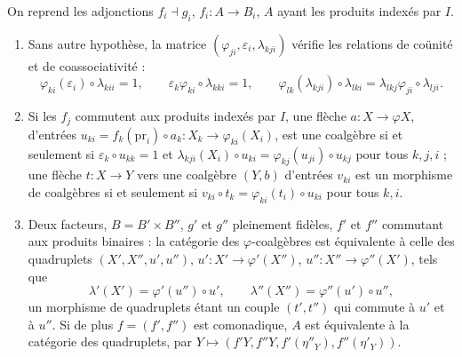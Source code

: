 \begin{encadre}
\begin{theoreme}\label{thm:19-quadruplets}
On reprend les adjonctions $f_i \dashv g_i$, $f_i : A \to B_i$, $A$ ayant les produits indexés par $I$.
\begin{enumerate}
\item Sans autre hypothèse, la matrice $(\varphi_{ji}, \varepsilon_i, \lambda_{kji})$ vérifie les relations de coünité et de coassociativité :
\[
\varphi_{ki}(\varepsilon_i) \circ \lambda_{kii} = 1, \qquad \varepsilon_k \varphi_{ki} \circ \lambda_{kki} = 1, \qquad \varphi_{lk}(\lambda_{kji}) \circ \lambda_{lki} = \lambda_{lkj}\varphi_{ji} \circ \lambda_{lji}.
\]
\item Si les $f_j$ commutent aux produits indexés par $I$, une flèche $a : X \to \varphi X$, d'entrées $u_{ki} = f_k(\mathrm{pr}_i) \circ a_k : X_k \to \varphi_{ki}(X_i)$, est une coalgèbre si et seulement si $\varepsilon_k \circ u_{kk} = 1$ et $\lambda_{kji}(X_i) \circ u_{ki} = \varphi_{kj}(u_{ji}) \circ u_{kj}$ pour tous $k, j, i$ ; une flèche $t : X \to Y$ vers une coalgèbre $(Y, b)$ d'entrées $v_{ki}$ est un morphisme de coalgèbres si et seulement si $v_{ki} \circ t_k = \varphi_{ki}(t_i) \circ u_{ki}$ pour tous $k, i$.
\item Deux facteurs, $B = B' \times B''$, $g'$ et $g''$ pleinement fidèles, $f'$ et $f''$ commutant aux produits binaires : la catégorie des $\varphi$-coalgèbres est équivalente à celle des quadruplets $(X', X'', u', u'')$, $u' : X' \to \varphi'(X'')$, $u'' : X'' \to \varphi''(X')$, tels que
\[
\lambda'(X') = \varphi'(u'') \circ u', \qquad \lambda''(X'') = \varphi''(u') \circ u'',
\]
un morphisme de quadruplets étant un couple $(t', t'')$ qui commute à $u'$ et à $u''$. Si de plus $f = (f', f'')$ est comonadique, $A$ est équivalente à la catégorie des quadruplets, par $Y \mapsto (f'Y, f''Y, f'(\eta''_Y), f''(\eta'_Y))$.
\end{enumerate}
\end{theoreme}
\end{encadre}

